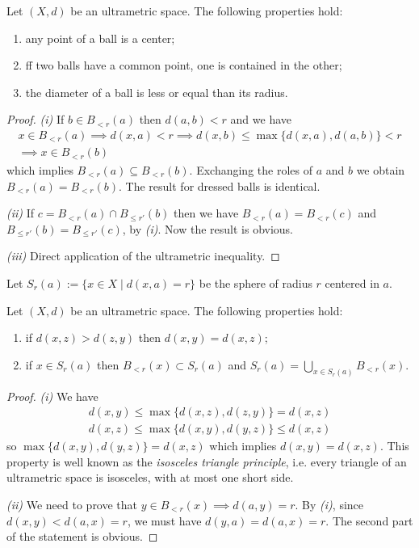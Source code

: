 		\begin{prop}
			Let $(X, d)$ be an ultrametric space. The following properties hold:
			\begin{enumerate}[label=(\roman*)]
				\item any point of a ball is a center;
				\item ff two balls have a common point, one is contained in the other;
				\item the diameter of a ball is less or equal than its radius.
			\end{enumerate}
		\end{prop}
		\begin{proof}
			\textit{(i)} If $b \in B_{<r}(a)$ then $d(a, b) < r$  and we have
			\begin{gather*}
				x \in B_{< r}(a) \implies d(x, a) < r \implies d(x, b) \leq \max \{d(x, a), d(a, b) \} < r \\
				\implies x \in B_{<r}(b)
			\end{gather*}
			which implies $B_{< r}(a) \subseteq B_{< r}(b)$. Exchanging the roles of $a$ and $b$ we obtain $B_{< r}(a) = B_{< r}(b)$. The result for dressed balls is identical.
			
			\textit{(ii)} If $c = B_{< r}(a) \cap B_{\leq r'}(b)$ then we have $B_{< r}(a) = B_{< r}(c)$ and $B_{\leq r'}(b) = B_{\leq r'}(c)$, by \textit{(i)}. Now the result is obvious.
			
			\textit{(iii)} Direct application of the ultrametric inequality.
		\end{proof}
		Let $S_r(a) := \{x \in X \mid d(x, a) = r \}$ be the sphere of radius $r$ centered in $a$.  
		\begin{prop}
			\label{prop:spheres}
			Let $(X, d)$ be an ultrametric space. The following properties hold:
			\begin{enumerate}[label=(\roman*)]
				\item if $d(x, z) > d(z, y)$ then $d(x, y) = d(x, z)$;
				\item if $x \in S_r(a)$ then $B_{< r}(x) \subset S_r(a)$ and $S_r(a) = \bigcup_{x \in S_r(a)} B_{< r}(x)$. 
			\end{enumerate}
		\end{prop}
		\begin{proof}
			\textit{(i)} We have 
			\begin{gather*}
				d(x, y) \leq \max \{d(x, z), d(z, y) \} = d(x, z) \\
				d(x, z) \leq \max \{d(x, y), d(y, z) \} \leq d(x, z)
			\end{gather*}
			so $\max \{d(x, y), d(y,z)\} = d(x, z)$ which implies $d(x, y) = d(x, z)$.
			This property is well known as the \emph{isosceles triangle principle}, i.e. every triangle of an ultrametric space is isosceles, with at most one short side.
			
			\textit{(ii)} We need to prove that $y \in B_{< r}(x) \implies d(a, y) = r$. By \textit{(i)}, since $d(x, y) < d(a, x) = r$, we must have $d(y, a) = d(a, x)= r$. The second part of the statement is obvious.
		\end{proof}
